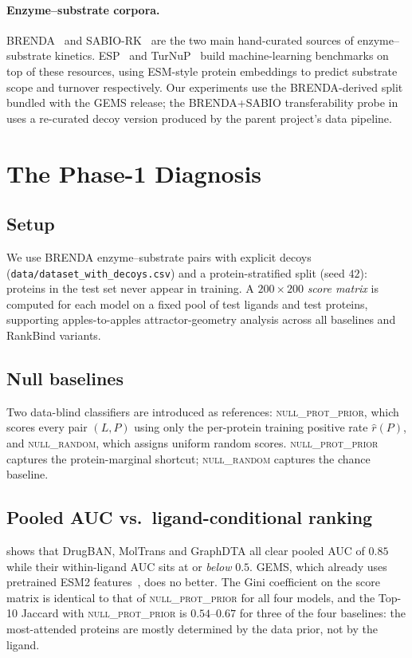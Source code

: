 \documentclass[11pt,a4paper]{article}
\newcommand{\method}{RankBind\xspace}
\newcommand{\nullprior}{\textsc{null\_prot\_prior}\xspace}
\newcommand{\nullrand}{\textsc{null\_random}\xspace}
\begin{document}
\paragraph{Enzyme--substrate corpora.}
BRENDA~\citep{chang2021brenda} and SABIO-RK~\citep{wittig2018sabiork}
are the two main hand-curated sources of enzyme--substrate kinetics.
ESP~\citep{kroll2023esp} and TurNuP~\citep{kroll2023turnup} build
machine-learning benchmarks on top of these resources, using
ESM-style protein embeddings to predict substrate scope and turnover
respectively. Our experiments use the BRENDA-derived split bundled with
the GEMS release; the BRENDA+SABIO transferability probe in
 uses a re-curated decoy version produced by
the parent project's data pipeline.

\section{The Phase-1 Diagnosis}
\label{sec:diagnosis}

\subsection{Setup}
We use BRENDA enzyme--substrate pairs with explicit decoys
(\texttt{data/dataset\_with\_decoys.csv}) and a protein-stratified split
(seed $42$): proteins in the test set never appear in training. A
$200 \times 200$ \emph{score matrix} is computed for each model on a
fixed pool of test ligands and test proteins, supporting apples-to-apples
attractor-geometry analysis across all baselines and \method variants.

\subsection{Null baselines}
Two data-blind classifiers are introduced as references:
\nullprior, which scores every pair $(L, P)$ using only the per-protein
training positive rate $\hat{r}(P)$, and \nullrand, which assigns
uniform random scores. \nullprior captures the protein-marginal
shortcut; \nullrand captures the chance baseline.

\subsection{Pooled AUC vs.\ ligand-conditional ranking}

 shows that DrugBAN, MolTrans and GraphDTA all clear
pooled AUC of $0.85$ while their within-ligand AUC sits at or
\emph{below} $0.5$. GEMS, which already uses pretrained ESM2
features~\citep{lin2023esm2}, does no better. The Gini coefficient on
the score matrix is identical to that of \nullprior for all four
models, and the Top-10 Jaccard with \nullprior is $0.54$--$0.67$ for
three of the four baselines: the most-attended proteins are mostly
determined by the data prior, not by the ligand.
\end{document}
